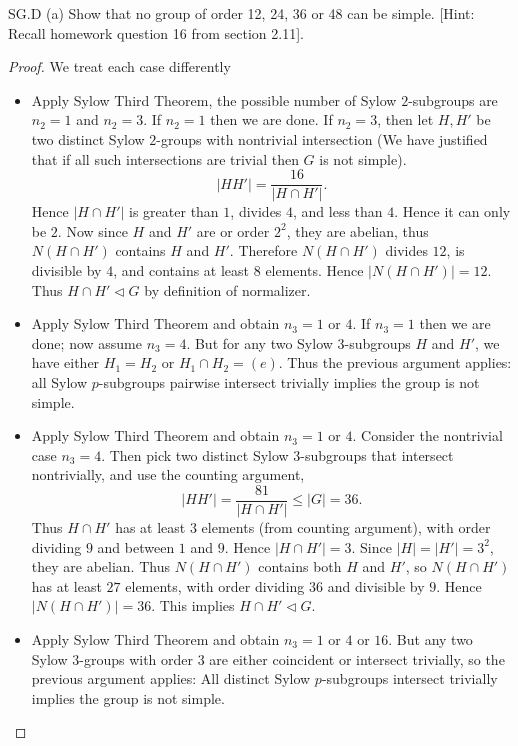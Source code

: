 SG.D
(a) Show that no group of order 12, 24, 36 or 48 can be simple. [Hint: Recall homework question 16 from section 2.11].
\begin{proof}
	We treat each case differently
	\begin{itemize}
		\item [order 12] Apply Sylow Third Theorem, the possible number of Sylow  $2$-subgroups are $n_2=1$ and $n_2=3$. If $n_2=1$ then we are done. If $n_2 = 3$, then let $H, H'$ be two distinct Sylow  $2$-groups with nontrivial intersection (We have justified that if all such intersections are trivial then $G$ is not simple).
			\[
				|H H'|  = \frac{16}{|H \cap H'|}
			.\] 
			Hence $|H \cap H'|$ is greater than $1$, divides  $4$, and less than $4$. Hence it can only be $2$. Now since $H$ and $H'$ are or order $2^2$, they are abelian, thus $N(H \cap H')$ contains $H$ and $H'$. Therefore $N(H \cap H')$ divides $12$, is divisible by $4$, and contains at least $8$ elements. Hence $|N(H \cap H')| = 12$. Thus $H \cap H' \triangleleft G$ by definition of normalizer.
		\item [order 24] Apply Sylow Third Theorem and obtain $n_3 = 1 $ or $4$. If $n_3 = 1$ then we are done; now assume $n_3 = 4$. But for any two Sylow $3$-subgroups $H$ and $H'$, we have either $H_1 = H_2$ or $H_1 \cap H_2 = (e)$. Thus the previous argument applies: all Sylow $p$-subgroups pairwise intersect trivially implies the group is not simple.
		\item [order 36] Apply Sylow Third Theorem and obtain $n_3 = 1$ or $4$. Consider the nontrivial case $n_3 = 4$. Then pick two distinct Sylow $3$-subgroups that intersect nontrivially, and use the counting argument,
			\[
				|H H'| = \frac{81}{|H \cap H'|}\le |G| = 36
			.\] 
			Thus $H \cap H'$ has at least $3$ elements (from counting argument), with order dividing $9$ and between $1$ and $9$. Hence $|H \cap H'| = 3$. Since $|H| = |H'| = 3^2$, they are abelian. Thus $N(H \cap H')$ contains both $H$ and $H'$, so $N(H \cap H')$ has at least $27$ elements, with order dividing $36$ and divisible by $9$. Hence $|N(H \cap H')| = 36$. This implies $H \cap H' \triangleleft G$.
		\item [order 48] Apply Sylow Third Theorem and obtain $n_3 = 1 $ or $4$ or $16$. But any two Sylow $3$-groups with order $3$ are either coincident or intersect trivially, so the previous argument applies: All distinct Sylow $p$-subgroups intersect trivially implies the group is not simple.
	\end{itemize}
	
\end{proof}

